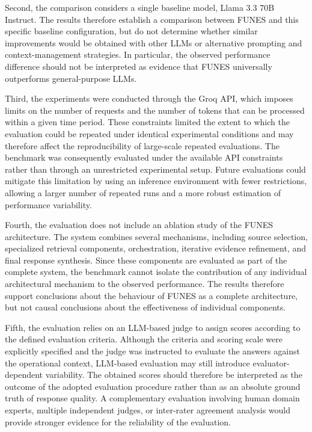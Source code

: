 Second, the comparison considers a single baseline model, Llama 3.3 70B Instruct. The results therefore establish a comparison between FUNES and this specific baseline configuration, but do not determine whether similar improvements would be obtained with other LLMs or alternative prompting and context-management strategies. In particular, the observed performance difference should not be interpreted as evidence that FUNES universally outperforms general-purpose LLMs.

Third, the experiments were conducted through the Groq API, which imposes limits on the number of requests and the number of tokens that can be processed within a given time period. These constraints limited the extent to which the evaluation could be repeated under identical experimental conditions and may therefore affect the reproducibility of large-scale repeated evaluations. The benchmark was consequently evaluated under the available API constraints rather than through an unrestricted experimental setup. Future evaluations could mitigate this limitation by using an inference environment with fewer restrictions, allowing a larger number of repeated runs and a more robust estimation of performance variability.

Fourth, the evaluation does not include an ablation study of the FUNES architecture. The system combines several mechanisms, including source selection, specialized retrieval components, orchestration, iterative evidence refinement, and final response synthesis. Since these components are evaluated as part of the complete system, the benchmark cannot isolate the contribution of any individual architectural mechanism to the observed performance. The results therefore support conclusions about the behaviour of FUNES as a complete architecture, but not causal conclusions about the effectiveness of individual components.

Fifth, the evaluation relies on an LLM-based judge to assign scores according to the defined evaluation criteria. Although the criteria and scoring scale were explicitly specified and the judge was instructed to evaluate the answers against the operational context, LLM-based evaluation may still introduce evaluator-dependent variability. The obtained scores should therefore be interpreted as the outcome of the adopted evaluation procedure rather than as an absolute ground truth of response quality. A complementary evaluation involving human domain experts, multiple independent judges, or inter-rater agreement analysis would provide stronger evidence for the reliability of the evaluation.

